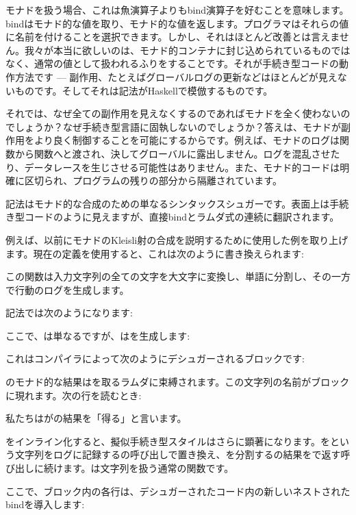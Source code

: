 モナドを扱う場合、これは魚演算子よりもbind演算子を好むことを意味します。bindはモナド的な値を取り、モナド的な値を返します。プログラマはそれらの値に名前を付けることを選択できます。しかし、それはほとんど改善とは言えません。我々が本当に欲しいのは、モナド的コンテナに封じ込められているものではなく、通常の値として扱われるふりをすることです。それが手続き型コードの動作方法です --- 副作用、たとえばグローバルログの更新などはほとんどが見えないものです。そしてそれは記法がHaskellで模倣するものです。

それでは、なぜ全ての副作用を見えなくするのであればモナドを全く使わないのでしょうか？なぜ手続き型言語に固執しないのでしょうか？答えは、モナドが副作用をより良く制御することを可能にするからです。例えば、モナドのログは関数から関数へと渡され、決してグローバルに露出しません。ログを混乱させたり、データレースを生じさせる可能性はありません。また、モナド的コードは明確に区切られ、プログラムの残りの部分から隔離されています。

記法はモナド的な合成のための単なるシンタックスシュガーです。表面上は手続き型コードのように見えますが、直接bindとラムダ式の連続に翻訳されます。

例えば、以前にモナドのKleisli射の合成を説明するために使用した例を取り上げます。現在の定義を使用すると、これは次のように書き換えられます: 

この関数は入力文字列の全ての文字を大文字に変換し、単語に分割し、その一方で行動のログを生成します。

記法では次のようになります: 

ここで、は単なるですが、はを生成します: 

これはコンパイラによって次のようにデシュガーされるブロックです: 

のモナド的な結果はを取るラムダに束縛されます。この文字列の名前がブロックに現れます。次の行を読むとき: 

私たちはがの結果を「得る」と言います。

をインライン化すると、擬似手続き型スタイルはさらに顕著になります。をという文字列をログに記録するの呼び出しで置き換え、を分割するの結果をで返す呼び出しに続けます。は文字列を扱う通常の関数です。

ここで、ブロック内の各行は、デシュガーされたコード内の新しいネストされたbindを導入します: 

